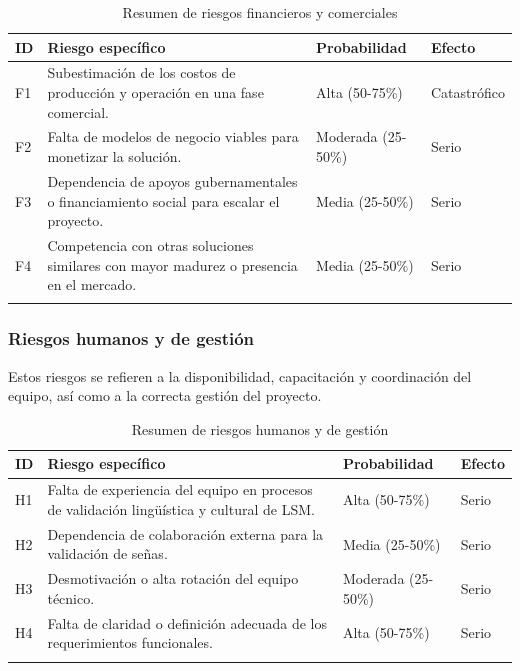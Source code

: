 \setlength{\tabcolsep}{4pt}
\renewcommand{\arraystretch}{1.2}

\begin{longtable}{|>{\centering\arraybackslash}p{0.8cm}|>{\raggedright\arraybackslash}p{3.5cm}|>{\raggedright\arraybackslash}p{5.1cm}|>{\raggedright\arraybackslash}p{5.1cm}|}
	\hline
	\textbf{ID} & \textbf{Riesgo específico} & \textbf{Probabilidad} & \textbf{Efecto} \\
	\hline
	F1 & Subestimación de los costos de producción y operación en una fase comercial. & Alta (50-75\%) & Catastrófico \\
	\hline
	F2 & Falta de modelos de negocio viables para monetizar la solución. & Moderada (25-50\%) & Serio \\
	\hline
	F3 & Dependencia de apoyos gubernamentales o financiamiento social para escalar el proyecto. & Media (25-50\%) & Serio \\
	\hline
	F4 & Competencia con otras soluciones similares con mayor madurez o presencia en el mercado. & Media (25-50\%) & Serio \\
	\hline
\caption{Resumen de riesgos financieros y comerciales} 
\label{tab:riesgos_financieros_resumen}
\end{longtable}

\subsubsection{Riesgos humanos y de gestión}
Estos riesgos se refieren a la disponibilidad, capacitación y coordinación del equipo, así como a la correcta gestión del proyecto.

\setlength{\tabcolsep}{4pt}
\renewcommand{\arraystretch}{1.2}

\begin{longtable}{|>{\centering\arraybackslash}p{0.8cm}|>{\raggedright\arraybackslash}p{3.5cm}|>{\raggedright\arraybackslash}p{5.1cm}|>{\raggedright\arraybackslash}p{5.1cm}|}
	\hline
	\textbf{ID} & \textbf{Riesgo específico} & \textbf{Probabilidad} & \textbf{Efecto} \\
	\hline
	H1 & Falta de experiencia del equipo en procesos de validación lingüística y cultural de LSM. & Alta (50-75\%) & Serio \\
	\hline
	H2 & Dependencia de colaboración externa para la validación de señas. & Media (25-50\%) & Serio \\
	\hline
	H3 & Desmotivación o alta rotación del equipo técnico. & Moderada (25-50\%) & Serio \\
	\hline
	H4 & Falta de claridad o definición adecuada de los requerimientos funcionales. & Alta (50-75\%) & Serio \\
	\hline
\caption{Resumen de riesgos humanos y de gestión} 
\label{tab:riesgos_humanoss_resumen}
\end{longtable}

